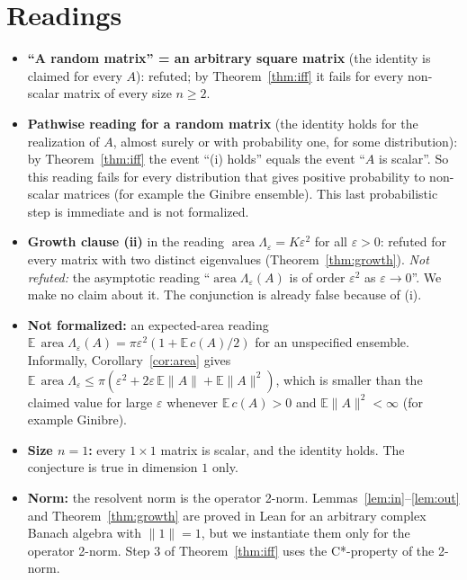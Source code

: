 \documentclass[11pt]{article}
\theoremstyle{definition}
\theoremstyle{remark}
\renewcommand{\_}{\oldus\allowbreak}
\newcommand{\area}{\operatorname{area}}
\begin{document}
\section{Readings}

\begin{itemize}
  \item \textbf{``A random matrix'' = an arbitrary square matrix} (the identity is claimed for every $A$):
        refuted; by Theorem~\ref{thm:iff} it fails for every non-scalar matrix of every size $n\ge 2$.
  \item \textbf{Pathwise reading for a random matrix} (the identity holds for the realization of $A$, almost
        surely or with probability one, for some distribution): by Theorem~\ref{thm:iff} the event ``(i) holds''
        equals the event ``$A$ is scalar''. So this reading fails for every distribution that gives positive
        probability to non-scalar matrices (for example the Ginibre ensemble). This last probabilistic step is
        immediate and is not formalized.
  \item \textbf{Growth clause (ii)} in the reading $\area\Lambda_\varepsilon = K\varepsilon^2$ for all
        $\varepsilon>0$: refuted for every matrix with two distinct eigenvalues (Theorem~\ref{thm:growth}).
        \emph{Not refuted:} the asymptotic reading ``$\area\Lambda_\varepsilon(A)$ is of order $\varepsilon^2$ as
        $\varepsilon\to0$''. We make no claim about it. The conjunction is already false because of (i).
  \item \textbf{Not formalized:} an expected-area reading
        $\mathbb{E}\,\area\Lambda_\varepsilon(A) = \pi\varepsilon^2(1+\mathbb{E}\,c(A)/2)$ for an unspecified
        ensemble. Informally, Corollary~\ref{cor:area} gives
        $\mathbb{E}\,\area\Lambda_\varepsilon\le\pi(\varepsilon^2+2\varepsilon\,\mathbb{E}\|A\|+\mathbb{E}\|A\|^2)$,
        which is smaller than the claimed value for large $\varepsilon$ whenever $\mathbb{E}\,c(A)>0$ and
        $\mathbb{E}\|A\|^2<\infty$ (for example Ginibre).
  \item \textbf{Size $n=1$:} every $1\times1$ matrix is scalar, and the identity holds. The conjecture is true
        in dimension $1$ only.
  \item \textbf{Norm:} the resolvent norm is the operator 2-norm. Lemmas~\ref{lem:in}--\ref{lem:out} and
        Theorem~\ref{thm:growth} are proved in Lean for an arbitrary complex Banach algebra with $\|1\|=1$, but
        we instantiate them only for the operator 2-norm. Step 3 of Theorem~\ref{thm:iff} uses the C*-property
        of the 2-norm.
\end{itemize}
\end{document}

